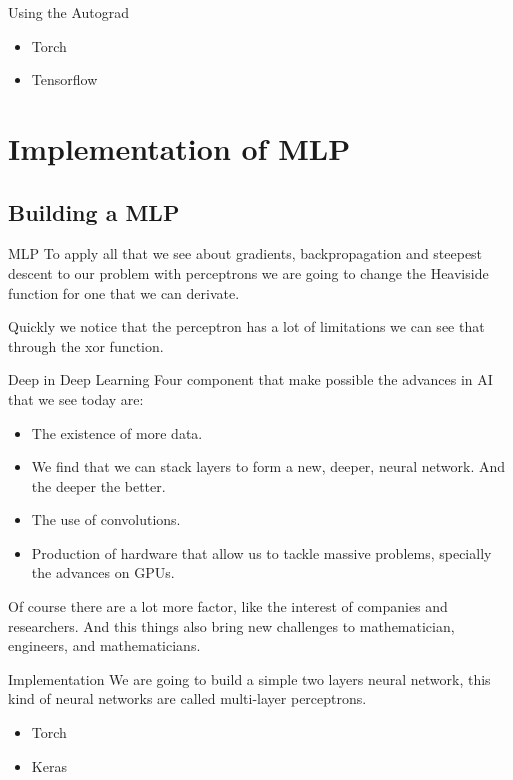\documentclass[presentation]{beamer}
\begin{document}
\begin{frame}[label={sec:org57fc9b0}]{Using the Autograd}
\begin{itemize}
\item Torch
\item Tensorflow
\end{itemize}
\end{frame}


\section{Implementation of MLP}
\label{sec:org07650b5}

\subsection{Building a MLP}
\label{sec:org678fc04}

\begin{frame}[label={sec:orgdf1d6f5}]{MLP}
To apply all that we see about gradients, backpropagation and steepest descent to our problem with perceptrons we are going to change the Heaviside function for one that we can derivate.

Quickly we notice that the perceptron has a lot of limitations we can see that through the xor function.
\end{frame}

\begin{frame}[label={sec:org795a0c3}]{Deep in Deep Learning}
Four component that make possible the advances in AI that we see today are:

\begin{itemize}
\item The existence of more data.
\item We find that we can stack layers to form a new, deeper, neural network. And the deeper the better.
\item The use of convolutions.
\item Production of hardware that allow us to tackle massive problems, specially the advances on GPUs.
\end{itemize}

Of course there are a lot more factor, like the interest of companies and researchers. And this things also bring new challenges to mathematician, engineers, and mathematicians.
\end{frame}


\begin{frame}[label={sec:org96f6261}]{Implementation}
We are going to build a simple two layers neural network, this kind of neural networks are called multi-layer perceptrons.

\begin{itemize}
\item Torch
\item Keras
\end{itemize}
\end{frame}
\end{document}
